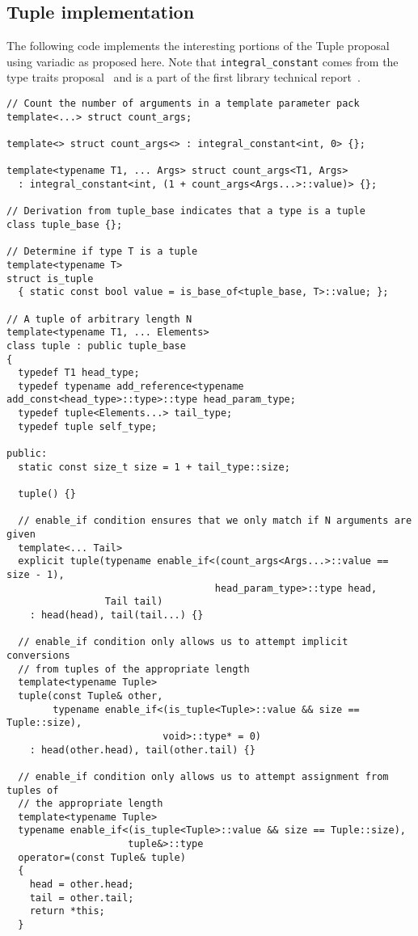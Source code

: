 \documentclass{article}
\begin{document}
\subsection{Tuple implementation}
\label{tupleimpl}
The following code implements the interesting portions of the Tuple
proposal~\cite{Jarvi02} using variadic as proposed here. Note that
{\tt integral\_constant} comes from the type traits
proposal~\cite{Maddock03} and is a part of the first library technical
report~\cite{Austern03}.

\small
\begin{verbatim}
// Count the number of arguments in a template parameter pack
template<...> struct count_args;

template<> struct count_args<> : integral_constant<int, 0> {};

template<typename T1, ... Args> struct count_args<T1, Args>
  : integral_constant<int, (1 + count_args<Args...>::value)> {};

// Derivation from tuple_base indicates that a type is a tuple
class tuple_base {};

// Determine if type T is a tuple
template<typename T>
struct is_tuple
  { static const bool value = is_base_of<tuple_base, T>::value; };

// A tuple of arbitrary length N
template<typename T1, ... Elements>
class tuple : public tuple_base 
{
  typedef T1 head_type;
  typedef typename add_reference<typename add_const<head_type>::type>::type head_param_type;
  typedef tuple<Elements...> tail_type;
  typedef tuple self_type;

public:
  static const size_t size = 1 + tail_type::size;

  tuple() {}

  // enable_if condition ensures that we only match if N arguments are given
  template<... Tail> 
  explicit tuple(typename enable_if<(count_args<Args...>::value == size - 1),
                                    head_param_type>::type head,
                 Tail tail)
    : head(head), tail(tail...) {}

  // enable_if condition only allows us to attempt implicit conversions
  // from tuples of the appropriate length
  template<typename Tuple>
  tuple(const Tuple& other,
        typename enable_if<(is_tuple<Tuple>::value && size == Tuple::size), 
                           void>::type* = 0)
    : head(other.head), tail(other.tail) {}

  // enable_if condition only allows us to attempt assignment from tuples of
  // the appropriate length
  template<typename Tuple>
  typename enable_if<(is_tuple<Tuple>::value && size == Tuple::size),
                     tuple&>::type
  operator=(const Tuple& tuple)
  {
    head = other.head;
    tail = other.tail;
    return *this;
  }


\end{verbatim}
\end{document}
